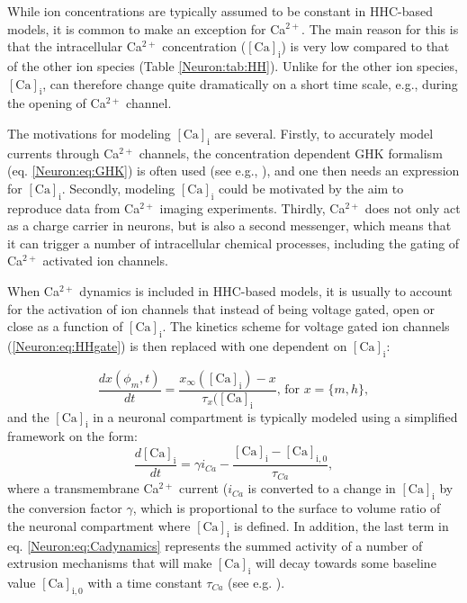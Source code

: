 \subsubsection{}
\label{sec:Neuron:Calcium}
While ion concentrations are typically assumed to be constant in HHC-based models, it is common to make an exception for Ca$^{2+}$. The main reason for this is that the intracellular Ca$^{2+}$ concentration ($\mathrm{[Ca]_i}$) is very low compared to that of the other ion species (Table \ref{Neuron:tab:HH}). Unlike for the other ion species,  $\mathrm{[Ca]_i}$, can therefore change quite dramatically on a short time scale, e.g., during the opening of Ca$^{2+}$ channel. 

The motivations for modeling $\mathrm{[Ca]_i}$ are several. Firstly, to accurately model currents through Ca$^{2+}$ channels, the concentration dependent GHK formalism (eq. \ref{Neuron:eq:GHK}) is often used (see e.g., \cite{Destexhe1994, Zhu1999, Halnes2011}), and one then needs an expression for $\mathrm{[Ca]_i}$. Secondly, modeling $\mathrm{[Ca]_i}$ could be motivated by the aim to reproduce data from Ca$^{2+}$ imaging experiments. Thirdly, Ca$^{2+}$ does not only act as a charge carrier in neurons, but is also a second messenger, which means that it can trigger a number of intracellular chemical processes, including the gating of Ca$^{2+}$ activated ion channels. 

When Ca$^{2+}$ dynamics is included in HHC-based models, it is usually to account for the activation of ion channels that instead of being voltage gated, open or close as a function of $\mathrm{[Ca]_i}$. The kinetics scheme for voltage gated ion channels (\ref{Neuron:eq:HHgate}) is then replaced with one dependent on $\mathrm{[Ca]_i}$:

\begin{equation}
\frac{dx(\phi_m,t)}{dt} = \frac{x_{\infty}(\mathrm{[Ca]_i}) - x}{\tau_x(\mathrm{[Ca]_i}},  \, \text{for } x = \{m,h\},
\label{Neuron:eq:Cagate}
\end{equation}
and the $\mathrm{[Ca]_i}$ in a neuronal compartment is typically modeled using a simplified framework on the form:
\begin{equation}
\frac{d\mathrm{[Ca]_i}}{dt} = \gamma i_{Ca} - \frac{\mathrm{[Ca]_i}-\mathrm{[Ca]_{i,0}}}{\tau_{Ca}}, 
\label{Neuron:eq:Cadynamics}
\end{equation}
where a transmembrane Ca$^{2+}$ current ($i_{Ca}$ is converted to a change in $\mathrm{[Ca]_i}$ by the conversion factor $\gamma$, which is proportional to the surface to volume ratio of the neuronal compartment where $\mathrm{[Ca]_i}$ is defined. In addition, the last term in eq. \ref{Neuron:eq:Cadynamics} represents the summed activity of a number of extrusion mechanisms that will make $\mathrm{[Ca]_i}$ will decay towards some baseline value $\mathrm{[Ca]_{i,0}}$ with a time constant $\tau_{Ca}$ (see e.g. \cite{Sterratt2011}).

